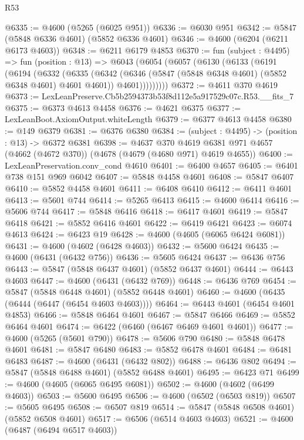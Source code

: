 \begin{lexlean}{R53}
\begin{coremodule}
@6335 := @4600 (@5265 (@6025 @951))
@6336 := @6030 @951
@6342 := @5847 (@5848 @6336 @4601) (@5852 @6336 @4601)
@6346 := @4600 (@6204 (@6211 @6173 @4603))
@6348 := @6211 @6179 @4853
@6370 := fun (subject : @4495) =>
  fun (position : @13) =>
  @6043
    (@6054
      (@6057
        (@6130
          (@6133
            (@6191
              (@6194
                (@6332
                  (@6335
                    (@6342
                      (@6346 (@5847 (@5848 @6348 @4601) (@5852 @6348 @4601) @4601 @4601))
                      @4601)))))))))
@6372 := @4611 @370 @4619
@6373 := LexLeanPreserve.Cb5b2594373b53f8d112e5a917529c07c.R53.__fits_7
@6375 := @6373 @4613 @4458
@6376 := @4621 @6375
@6377 := LexLeanBoot.AxiomOutput.whiteLength
@6379 := @6377 @4613 @4458
@6380 := @149 @6379
@6381 := @6376 @6380
@6384 := (subject : @4495) -> (position : @13) -> @6372 @6381
@6398 := @4637
    @370
    @4619
    @6381
    @971
    @4657
    (@4662 (@4672 @370))
    (@4678 (@4679 (@4680 @971) @4619 @4655))
@6400 := LexLeanPreservation.conv_cond @4610
@6401 := @6400 @4657
@6405 := @6401 @738 @151 @969 @6042
@6407 := @5848 @4458 @4601
@6408 := @5847 @6407
@6410 := @5852 @4458 @4601
@6411 := @6408 @6410
@6412 := @6411 @4601
@6413 := @5601 @744
@6414 := @5265 @6413
@6415 := @4600 @6414
@6416 := @5606 @744
@6417 := @5848 @6416
@6418 := @6417 @4601
@6419 := @5847 @6418
@6421 := @5852 @6416 @4601
@6422 := @6419 @6421
@6423 := @6074 @4613
@6424 := @6423 @19
@6428 := @4600 (@4605 (@6065 @6424 @6081))
@6431 := @4600 (@4602 (@6428 @4603))
@6432 := @5600 @6424
@6435 := @4600 (@6431 (@6432 @756))
@6436 := @5605 @6424
@6437 := @6436 @756
@6443 := @5847 (@5848 @6437 @4601) (@5852 @6437 @4601)
@6444 := @6443 @4603
@6447 := @4600 (@6431 (@6432 @769))
@6448 := @6436 @769
@6454 := @5847 (@5848 @6448 @4601) (@5852 @6448 @4601)
@6460 := @4600 (@6435 (@6444 (@6447 (@6454 @4603 @4603))))
@6464 := @6443 @4601 (@6454 @4601 @4853)
@6466 := @5848 @6464 @4601
@6467 := @5847 @6466
@6469 := @5852 @6464 @4601
@6474 := @6422 (@6460 (@6467 @6469 @4601 @4601))
@6477 := @4600 (@5265 (@5601 @790))
@6478 := @5606 @790
@6480 := @5848 @6478 @4601
@6481 := @5847 @6480
@6483 := @5852 @6478 @4601
@6484 := @6481 @6483
@6487 := @4600 (@6431 (@6432 @802))
@6488 := @6436 @802
@6494 := @5847 (@5848 @6488 @4601) (@5852 @6488 @4601)
@6495 := @6423 @71
@6499 := @4600 (@4605 (@6065 @6495 @6081))
@6502 := @4600 (@4602 (@6499 @4603))
@6503 := @5600 @6495
@6506 := @4600 (@6502 (@6503 @819))
@6507 := @5605 @6495
@6508 := @6507 @819
@6514 := @5847 (@5848 @6508 @4601) (@5852 @6508 @4601)
@6517 := @6506 (@6514 @4603 @4603)
@6521 := @4600 (@6487 (@6494 @6517 @4603))

\end{coremodule}
\end{lexlean}
